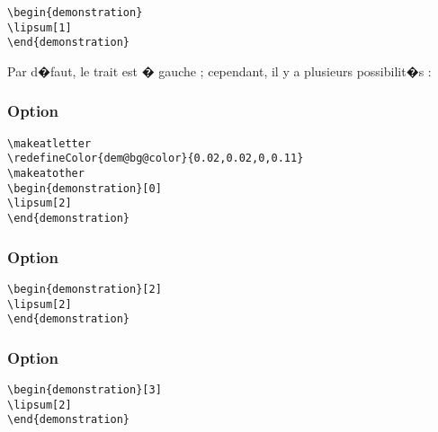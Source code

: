 \documentclass[ams,openany,10pt,presentation,latin1]{mathbook}
\begin{document}
\begin{lstlisting}
\begin{demonstration}
\lipsum[1]
\end{demonstration}
\end{lstlisting}

\begin{demonstration}
\lipsum[1]
\end{demonstration}

Par d�faut, le trait est � gauche ; cependant, il y a plusieurs possibilit�s :

\subsubsection{Option  \fg}

\begin{lstlisting}
\makeatletter
\redefineColor{dem@bg@color}{0.02,0.02,0,0.11}
\makeatother
\begin{demonstration}[0]
\lipsum[2]
\end{demonstration}
\end{lstlisting}

\makeatletter
{}
\makeatother
\begin{demonstration}[0]
\lipsum[2]
\end{demonstration}

\subsubsection{Option  \fg}

\begin{lstlisting}
\begin{demonstration}[2]
\lipsum[2]
\end{demonstration}
\end{lstlisting}

\makeatletter
{}
\makeatother
\begin{demonstration}[2]
\lipsum[2]
\end{demonstration}

\subsubsection{Option  \fg}

\begin{lstlisting}
\begin{demonstration}[3]
\lipsum[2]
\end{demonstration}
\end{lstlisting}
\end{document}
